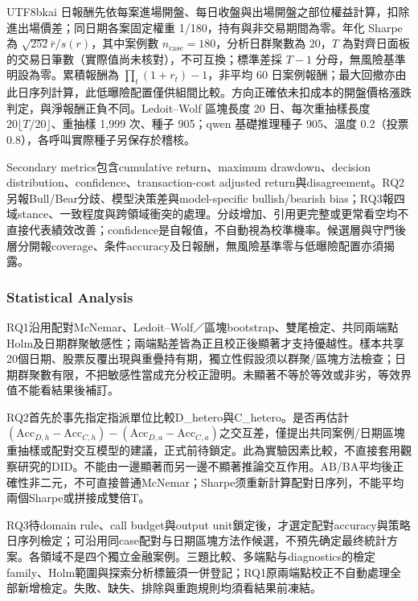 \documentclass[12pt,a4paper]{article}
\begin{document}
\begin{CJK}{UTF8}{bkai}
日報酬先依每案進場開盤、每日收盤與出場開盤之部位權益計算，扣除進出場價差；同日期各案固定權重 1/180，持有與非交易期間為零。年化 Sharpe 為 $\sqrt{252}\bar r/s(r)$，其中案例數 $n_{\mathrm{case}}=180$，分析日群聚數為 20，$T$ 為對齊日面板的交易日筆數（實際值尚未核對），不可互換；標準差採 $T-1$ 分母，無風險基準明設為零。累積報酬為 $\prod_t(1+r_t)-1$，非平均 60 日案例報酬；最大回撤亦由此日序列計算，此低曝險配置僅供組間比較。方向正確依未扣成本的開盤價格漲跌判定，與淨報酬正負不同。Ledoit--Wolf 區塊長度 20 日、每次重抽樣長度 $20\lfloor T/20\rfloor$、重抽樣 1,999 次、種子 905；qwen 基礎推理種子 905、溫度 0.2（投票 0.8），各呼叫實際種子另保存於稽核。



Secondary metrics包含cumulative return、maximum drawdown、decision distribution、confidence、transaction-cost adjusted return與disagreement。RQ2另報Bull/Bear分歧、模型決策差與model-specific bullish/bearish bias；RQ3報四域stance、一致程度與跨領域衝突的處理。分歧增加、引用更完整或更常看空均不直接代表績效改善；confidence是自報值，不自動視為校準機率。候選層與守門後層分開報coverage、条件accuracy及日報酬，無風險基準零与低曝險配置亦須揭露。

\subsubsection{Statistical Analysis}

RQ1沿用配對McNemar、Ledoit--Wolf／區塊bootstrap、雙尾檢定、共同兩端點Holm及日期群聚敏感性；兩端點差皆為正且校正後顯著才支持優越性。樣本共享20個日期、股票反覆出現與重疊持有期，獨立性假設须以群聚/區塊方法檢查；日期群聚數有限，不把敏感性當成充分校正證明。未顯著不等於等效或非劣，等效界值不能看結果後補訂。

RQ2首先於事先指定指派單位比較D\_hetero與C\_hetero。是否再估計$(\mathrm{Acc}_{D,h}-\mathrm{Acc}_{C,h})-(\mathrm{Acc}_{D,a}-\mathrm{Acc}_{C,a})$之交互差，僅提出共同案例/日期區塊重抽樣或配對交互模型的建議，正式前待鎖定。此為實驗因素比較，不直接套用觀察研究的DID。不能由一邊顯著而另一邊不顯著推論交互作用。AB/BA平均後正確性非二元，不可直接普通McNemar；Sharpe须重新計算配對日序列，不能平均兩個Sharpe或拼接成雙倍T。

RQ3待domain rule、call budget與output unit鎖定後，才選定配對accuracy與策略日序列檢定；可沿用同case配對与日期區塊方法作候選，不預先确定最终統計方案。各領域不是四个獨立金融案例。三題比較、多端點与diagnostics的檢定family、Holm範圍與探索分析標籤須一併登記；RQ1原兩端點校正不自動處理全部新增檢定。失敗、缺失、排除與重跑規則均須看結果前凍結。


\end{CJK}
\end{document}
